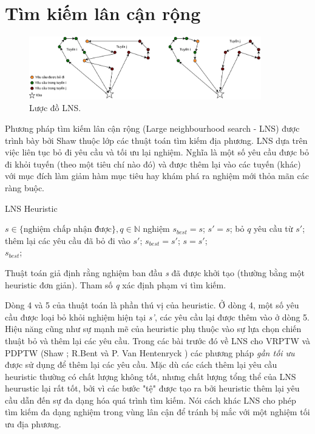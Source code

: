 \section{Tìm kiếm lân cận rộng}

\begin{figure}[H] %
  \centering %
  \includegraphics[width=0.9\textwidth]{figures/ALNS-paradim.png} 
  \caption{Lược đồ LNS.} 
  \label{fig:lns_paradim}
\end{figure}

Phương pháp tìm kiếm lân cận rộng (Large neighbourhood search - LNS) được trình bày bởi Shaw \cite{shaw1998using} thuộc lớp các thuật toán tìm kiếm địa phương. LNS dựa trên việc liên tục bỏ đi yêu cầu và tối ưu lại nghiệm. Nghĩa là một số yêu cầu được bỏ đi khỏi tuyến (theo một tiêu chí nào đó) và được thêm lại vào các tuyến (khác) với mục đích làm giảm hàm mục tiêu hay khám phá ra nghiệm mới thỏa mãn các ràng buộc.

\begin{algorithm}
  \label{alg:lns}
	\caption{LNS Heuristic} 
	\begin{algorithmic}[1]
        \Require $s \in \text{\{nghiệm chấp nhận được\}}, q \in \mathbb{N}$
        \State nghiệm $s_{best} = s$;
				\Repeat
					\State $s'=s$;
					\State bỏ $q$ yêu cầu từ $s'$;
					\State thêm lại các yêu cầu đã bỏ đi vào $s'$;
						\State $s_{best} = s'$;
					\EndIf
						\State $s=s'$;
					\EndIf
				\\
				\Return $s_{best}$;
	\end{algorithmic} 
\end{algorithm}

Thuật toán giả định rằng nghiệm ban đầu \textit{s} đã được khởi tạo (thường bằng một heuristic đơn giản). Tham số \textit{q} xác định phạm vi tìm kiếm. 

Dòng 4 và 5 của thuật toán là phần thú vị của heuristic. Ở dòng 4, một số yêu cầu được loại bỏ khỏi nghiệm hiện tại \textit{s'}, các yêu cầu lại được thêm vào ở dòng 5. Hiệu năng cũng như sự mạnh mẽ của heuristic phụ thuộc vào sự lựa chọn chiến thuật bỏ và thêm lại các yêu cầu. Trong các bài trước đó về LNS cho VRPTW và PDPTW (Shaw \cite{shaw1997new}; R.Bent và P. Van Hentenryck \cite{bent2003two}) các phương pháp \textit{gần tối ưu} được sử dụng để thêm lại các yêu cầu. Mặc dù các cách thêm lại yêu cầu heuristic thường có chất lượng không tốt, nhưng chất lượng tổng thể của LNS heurustic lại rất tốt, bởi vì các bước "tệ" được tạo ra bởi heuristic thêm lại yêu cầu dẫn đến sự đa dạng hóa quá trình tìm kiếm. Nói cách khác LNS cho phép tìm kiếm đa dạng nghiệm trong vùng lân cận để tránh bị mắc với một nghiệm tối ưu địa phương.

